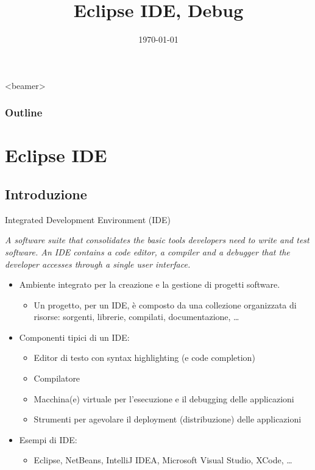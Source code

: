 \documentclass[presentation]{beamer}
\title[{\lab} -- Eclipse, Debug]{Eclipse IDE, Debug}
\date[\today]{\today}
\begin{document}
	
\frame[label=coverpage]{\titlepage}

\begin{frame}<beamer>
	\frametitle{Outline}
	\tableofcontents[]
\end{frame}

\section{Eclipse IDE}
\subsection{Introduzione}

\begin{frame}{Integrated Development Environment (IDE)}
	\begin{block}{}
		\emph{A software suite that consolidates the basic tools developers need to write and test software. An IDE contains a code editor, a compiler and a debugger that the developer accesses through a single user interface.}
	\end{block}
	\begin{itemize}
		\item Ambiente integrato per la creazione e la gestione di progetti software.
		\begin{itemize}
			\item Un progetto, per un IDE, è composto da una collezione organizzata di risorse: sorgenti, librerie, compilati, documentazione, \dots
		\end{itemize}
		\item Componenti tipici di un IDE:
		\begin{itemize}
			\item Editor di testo con syntax highlighting (e code completion)
			\item Compilatore
			\item Macchina(e) virtuale per l'esecuzione e il debugging delle applicazioni
			\item Strumenti per agevolare il deployment (distribuzione) delle applicazioni
		\end{itemize}
		\item Esempi di IDE:
		\begin{itemize}
			\item Eclipse, NetBeans, IntelliJ IDEA, Microsoft Visual Studio, XCode, \dots
		\end{itemize}
	\end{itemize}
\end{frame}
\end{document}
